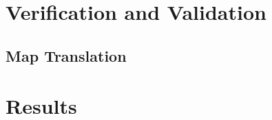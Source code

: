 \documentclass[12pt,twoside]{article}
\begin{document}
\section{Verification and Validation}
\label{section:VerificationAndValidation}

\subsection{Map Translation}

\section{Results}
\label{section:Results}
\end{document}
